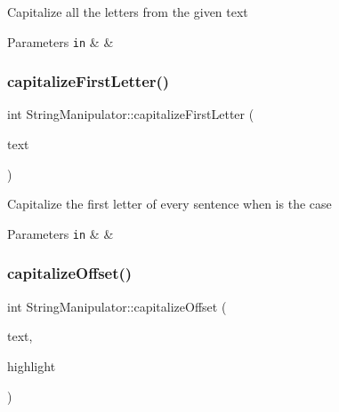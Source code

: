 Capitalize all the letters from the given text


\begin{DoxyParams}[1]{Parameters}
\mbox{\tt in}  & {\em } & \\
\hline
\end{DoxyParams}
\mbox{\label{class_string_manipulator_af0c3de234425bcbdeba6ffb32fb9486b}} 
\subsubsection{\texorpdfstring{capitalize\+First\+Letter()}{capitalizeFirstLetter()}}
{\footnotesize\ttfamily int String\+Manipulator\+::capitalize\+First\+Letter (\begin{DoxyParamCaption}\item[{std\+::string \&}]{text }\end{DoxyParamCaption})\hspace{0.3cm}{\ttfamily [static]}}

Capitalize the first letter of every sentence when is the case


\begin{DoxyParams}[1]{Parameters}
\mbox{\tt in}  & {\em } & \\
\hline
\end{DoxyParams}
\mbox{\label{class_string_manipulator_ab12616f5d40ce39ba3d26f2af39fc8d9}} 
\subsubsection{\texorpdfstring{capitalize\+Offset()}{capitalizeOffset()}}
{\footnotesize\ttfamily int String\+Manipulator\+::capitalize\+Offset (\begin{DoxyParamCaption}\item[{std\+::string \&}]{text,  }\item[{const \hyperlink{class_text_high_light}{Text\+High\+Light}}]{highlight }\end{DoxyParamCaption})\hspace{0.3cm}{\ttfamily [static]}}

